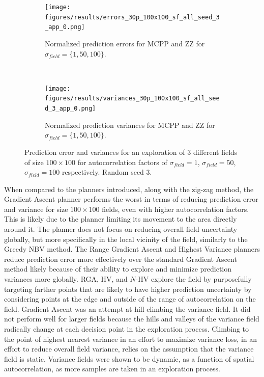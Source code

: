 \begin{figure}[htb!]
    \centering
    \begin{subfigure}[t]{0.75\textwidth}
        \centering
        \texttt{[image: figures/results/errors\_30p\_100x100\_sf\_all\_seed\_3\_app\_0.png]}
        \captionsetup{skip=0.20\baselineskip,size=footnotesize}
        \caption{Normalized prediction errors for MCPP and ZZ for $\sigma_{field} = \{1, 50, 100\}$.}
    \end{subfigure}%
    \\
    \begin{subfigure}[t]{0.75\textwidth}
        \centering
        \texttt{[image: figures/results/variances\_30p\_100x100\_sf\_all\_seed\_3\_app\_0.png]}
        \captionsetup{skip=0.20\baselineskip,size=footnotesize}
        \caption{Normalized prediction variances for MCPP and ZZ for $\sigma_{field} = \{1, 50, 100\}$.}
    \end{subfigure}%
    \ssp
    \captionsetup{skip=0.20\baselineskip}
    \caption{Prediction error and variances for an exploration of $3$ different fields of size $100 \times 100$ for autocorrelation factors of $\sigma_{field} = 1$, $\sigma_{field} = 50$, $\sigma_{field} = 100$ respectively. Random seed 3.}
    \label{fig:multaccomp_s3}
\end{figure}
\FloatBarrier

When compared to the planners introduced, along with the zig-zag method, the Gradient Ascent planner performs the worst in terms of reducing prediction error and variance for size $100 \times 100$ fields, even with higher autocorrelation factors. This is likely due to the planner limiting its movement to the area directly around it. The planner does not focus on reducing overall field uncertainty globally, but more specifically in the local vicinity of the field, similarly to the Greedy NBV method. The Range Gradient Ascent and Highest Variance planners reduce prediction error more effectively over the standard Gradient Ascent method likely because of their ability to explore and minimize prediction variances more globally. RGA, HV, and $N$-HV explore the field by purposefully targeting farther points that are likely to have higher prediction uncertainty by considering points at the edge and outside of the range of autocorrelation on the field. Gradient Ascent was an attempt at hill climbing the variance field. It did not perform well for larger fields because the hills and valleys of the variance field radically change at each decision point in the exploration process. Climbing to the point of highest nearest variance in an effort to maximize variance loss, in an effort to reduce overall field variance, relies on the assumption that the variance field is static. Variance fields were shown to be dynamic, as a function of spatial autocorrelation, as more samples are taken in an exploration process.

